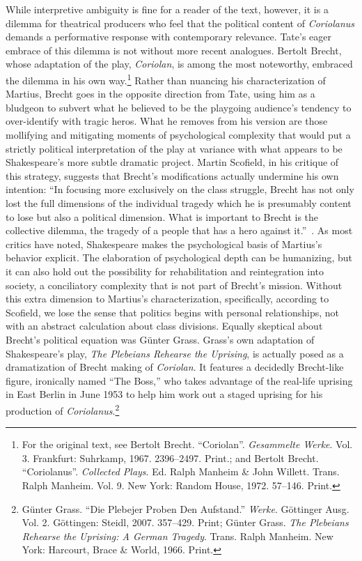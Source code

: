 While interpretive ambiguity is fine for a reader of the text, however, it is a dilemma for theatrical producers who feel that the political content of \emph{Coriolanus} demands a performative response with contemporary relevance.
Tate's eager embrace of this dilemma is not without more recent analogues.
Bertolt Brecht, whose adaptation of the play, \emph{Coriolan}, is among the most noteworthy, embraced the dilemma in his own way.\footnote{For the original text, see Bertolt Brecht. ``Coriolan''. \emph{Gesammelte Werke}. Vol. 3. Frankfurt: Suhrkamp, 1967. 2396–2497. Print.\nocite{brecht_coriolan_1967}; and Bertolt Brecht. ``Coriolanus''. \emph{Collected Plays}. Ed. Ralph Manheim \& John Willett. Trans. Ralph Manheim. Vol. 9. New York: Random House, 1972. 57–146. Print. \nocite{brecht_manheim_1972}} 
Rather than nuancing his characterization of Martius, Brecht goes in the opposite direction from Tate, using him as a bludgeon to subvert what he believed to be the playgoing audience's tendency to over-identify with tragic heros.
What he removes from his version are those mollifying and mitigating moments of psychological complexity that would put a strictly political interpretation of the play at variance with what appears to be Shakespeare's more subtle dramatic project.
Martin Scofield, in his critique of this strategy, suggests that Brecht's modifications actually undermine his own intention: ``In focusing more exclusively on the class struggle, Brecht has not only lost the full dimensions of the individual tragedy which he is presumably content to lose but also a political dimension.
What is important to Brecht is the collective dilemma, the tragedy of a people that has a hero against it.''~\cite[335]{scofield_drama_1990}.
As most critics have noted, Shakespeare makes the psychological basis of Martius's behavior explicit.
The elaboration of psychological depth can be humanizing, but it can also hold out the possibility for rehabilitation and reintegration into society, a conciliatory complexity that is not part of Brecht's mission.
Without this extra dimension to Martius's characterization, specifically, according to Scofield, we lose the sense that politics begins with personal relationships, not with an abstract calculation about class divisions.
Equally skeptical about Brecht's political equation was Günter Grass.
Grass's own adaptation of Shakespeare's play, \emph{The Plebeians Rehearse the Uprising}, is actually posed as a dramatization of Brecht making of \emph{Coriolan}.
It features a decidedly Brecht-like figure, ironically named ``The Boss,'' who takes advantage of the real-life uprising in East Berlin in June 1953 to help him work out a staged uprising for his production of \emph{Coriolanus}.\footnote{Günter Grass. ``Die Plebejer Proben Den Aufstand.'' \emph{Werke}. Göttinger Ausg. Vol. 2. Göttingen: Steidl, 2007. 357–429. Print; \nocite{grass_plebejer_2007} Günter Grass. \emph{The Plebeians Rehearse the Uprising: A German Tragedy}. Trans. Ralph Manheim. New York: Harcourt, Brace \& World, 1966. Print. \nocite{grass_plebeians_1966}} 
